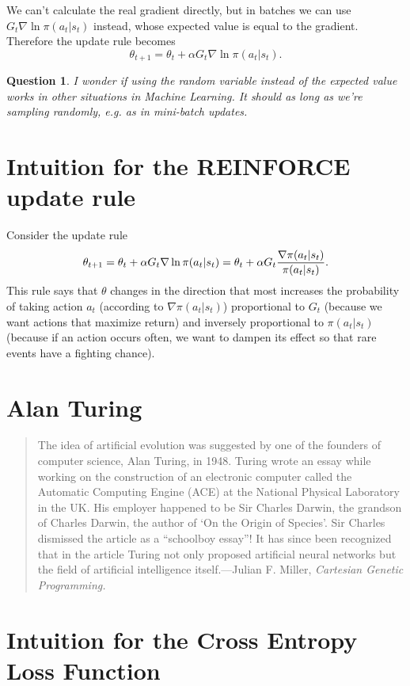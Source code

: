 \documentclass[10pt]{article}
\theoremstyle{plain}
\newtheorem{question}[theorem]{Question}
\theoremstyle{definition}
\theoremstyle{remark}
\renewcommand\frac[2]{\genfrac{}{}{0.5pt}{}{#1}{#2}}
\newcommand{\0}{\varnothing}
\newcommand{\<}{\langle}
\renewcommand{\>}{\rangle}
\begin{document}
We can't calculate the real gradient directly, but in batches we can use $ G_t \nabla \ln \pi(a_t|s_t) $ instead, whose expected value is equal to the gradient. Therefore the update rule becomes $$
\theta_{t+1} = \theta_t + \alpha G_t \nabla \ln \pi(a_t|s_t).
$$

\begin{question}
  I wonder if using the random variable instead of the expected value works in other situations in Machine Learning. It should as long as we're sampling randomly, e.g. as in mini-batch updates.
\end{question}

\section{Intuition for the REINFORCE update rule}

Consider the update rule \[
\theta_{t+1} = \theta_t + \alpha G_t \nabla \ln \pi(a_t|s_t) = \theta_t + \alpha G_t  \frac{\nabla \pi(a_t|s_t)}{\pi(a_t|s_t)}.
\]
This rule says that $ \theta $ changes in the direction that most increases the probability of taking action $ a_t $ (according to $ \nabla \pi(a_t|s_t) $) proportional to $ G_t $ (because we want actions that maximize return) and inversely proportional to $ \pi(a_t|s_t)$ (because if an action occurs often, we want to dampen its effect so that rare events have a fighting chance).

\section{Alan Turing}

\begin{quote}
  The idea of artificial evolution was suggested by one of the founders of computer science, Alan Turing, in 1948. Turing wrote an essay while working on the construction of an electronic computer called the Automatic Computing Engine (ACE) at the National Physical Laboratory in the UK. His employer happened to be Sir Charles Darwin, the grandson of Charles Darwin, the author of `On the Origin of Species'. Sir Charles dismissed the article as a ``schoolboy essay''! It has since been recognized that in the article Turing not only proposed artificial neural networks but the field of artificial intelligence itself.---Julian F. Miller, \emph{Cartesian Genetic Programming.}
\end{quote}

\section{Intuition for the Cross Entropy Loss Function}
\end{document}

